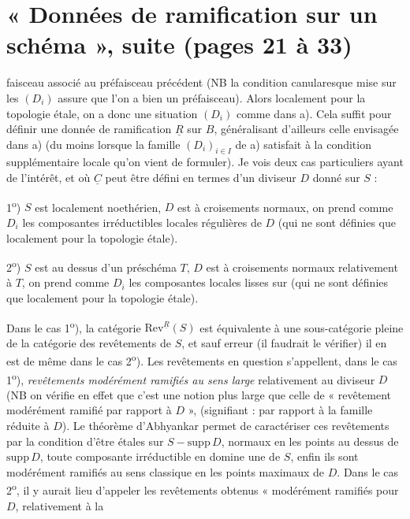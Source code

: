 \documentclass[11pt,a4paper]{article}
\begin{document}
\section*{« Données de ramification sur un schéma », suite (pages 21 à 33)}

faisceau associé au préfaisceau précédent (NB la condition canularesque mise
sur les $(D_i)$ assure que l'on a bien un préfaisceau). Alors localement pour
la topologie étale, on a donc une situation $(D_i)$ comme dans a). Cela suffit
pour définir une donnée de ramification $\underline{R}$ sur $B$, généralisant
d'ailleurs celle envisagée dans a) (du moins lorsque la famille
$(D_i)_{i \in I}$ de a) satisfait à la condition supplémentaire locale qu'on
vient de formuler). Je vois deux cas particuliers ayant de l'intérêt,
\struck{\ill{}} et \struck{\ill{})} où $\underline{C}$ peut être défini en
termes d'un diviseur $D$ donné sur $S$ :

1\textsuperscript{o}) $S$ est localement noethérien, $D$ est à croisements
normaux, on prend comme $D_i$ les composantes irréductibles locales régulières
de $D$ (qui ne sont définies que localement pour la topologie étale).

2\textsuperscript{o}) $S$ est au dessus d'un préschéma $T$, $D$ est à
croisements normaux relativement à $T$, on prend comme $D_i$ les composantes
locales lisses sur  (qui ne sont définies que localement pour la
topologie étale).

Dans le cas 1\textsuperscript{o}), la catégorie
$\mathrm{Rev}^{\underline{R}}(S)$ est équivalente à une sous-catégorie pleine
de la catégorie des revêtements de $S$, et sauf erreur (il faudrait le
vérifier) il en est de même dans le cas 2\textsuperscript{o}). Les revêtements
en question s'appellent, dans le cas 1\textsuperscript{o}),
\emph{revêtements modérément ramifiés au sens large} relativement au diviseur
$D$ (NB on vérifie en effet que c'est une notion plus large que celle de
« revêtement modérément ramifié par rapport à $D$ », (signifiant : par rapport
à la famille réduite à $D$). Le théorème d'Abhyankar permet de caractériser ces
revêtements par la condition d'être étales sur \struck{\ill{}}
$S - \mathrm{supp}\,D$, normaux en les points au dessus de $\mathrm{supp}\,D$,
toute composante irréductible en domine une de $S$, enfin ils sont modérément
ramifiés au sens classique en les points maximaux de $D$. Dans le cas
2\textsuperscript{o}, il y aurait lieu d'appeler les revêtements obtenus
« modérément ramifiés pour $D$, relativement à la
\end{document}
